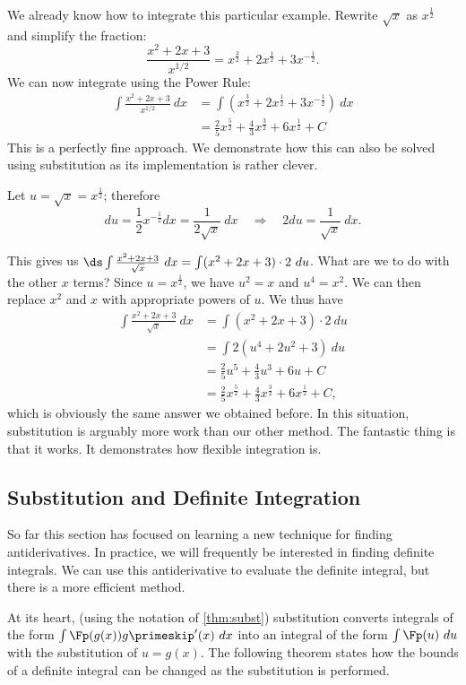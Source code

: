 {We already know how to integrate this particular example. Rewrite $\sqrt{x}$ as $x^\frac12$ and simplify the fraction:
	$$ \frac{x^2+2x+3}{x^{1/2}} = x^\frac32 + 2x^\frac12 + 3x^{-\frac12}.$$
We can now integrate using the Power Rule:
\begin{align*}
	\int \frac{x^2+2x+3}{x^{1/2}}\ dx &= \int\left(x^\frac32 + 2x^\frac12 + 3x^{-\frac12}\right)\ dx\\
	&=	\frac25x^\frac52 + \frac43x^\frac32 + 6x^\frac12 + C
\end{align*}
This is a perfectly fine approach. We demonstrate how this can also be solved using substitution as its implementation is rather clever.

Let $u = \sqrt{x} = x^\frac12$; therefore 
		$$du = \frac12x^{-\frac12}dx = \frac{1}{2\sqrt{x}}\ dx \quad \Rightarrow \quad 2du = \frac{1}{\sqrt{x}}\ dx.$$
		
This gives us $\ds \int \frac{x^2+2x+3}{\sqrt{x}}\ dx = \int (x^2+2x+3)\cdot2\ du$. What are we to do with the other $x$ terms? Since $u=x^{\frac12}$, we have $u^2=x$ and $u^4=x^2$. We can then replace $x^2$ and $x$ with appropriate powers of $u$. We thus have
\begin{align*}
	\int \frac{x^2+2x+3}{\sqrt{x}}\ dx
	&= \int (x^2+2x+3)\cdot2\ du\\
	&= \int 2(u^4 + 2u^2 + 3)\ du \\
	&= \frac25u^5 + \frac43u^3 + 6u + C \\
	&= \frac25x^\frac52 + \frac43x^\frac32 + 6x^\frac12+C,
\end{align*}
which is obviously the same answer we obtained before. In this situation, substitution is arguably more work than our other method. The fantastic thing is that it works. It demonstrates how flexible integration is.}


\subsection*{Substitution and Definite Integration}

So far this section has focused on learning a new technique for finding antideriv\-atives. In practice, we will frequently be interested in finding definite integrals. We can use this antiderivative to evaluate the definite integral, but there is a more efficient method.

At its heart, (using the notation of \autoref{thm:subst}) substitution converts integrals of the form $\int \Fp(g(x))g\primeskip'(x)\ dx$ into an integral of the form $\int \Fp(u)\ du$ with the substitution of $u = g(x)$. The following theorem states how the bounds of a definite integral can be changed as the substitution is performed.

